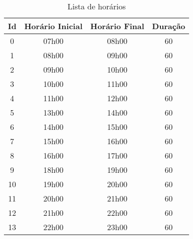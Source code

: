 \begin{apendices}
\begin{table}[H]
\footnotesize
\centering
\begin{tabular}{|c|c|c|c|}
\hline
\textbf{Id} & \textbf{Horário Inicial} & \textbf{Horário Final} & \textbf{Duração} \\ \hline
0 & 07h00 & 08h00 & 60 \\ \hline
1 & 08h00 & 09h00 & 60 \\ \hline
2 & 09h00 & 10h00 & 60 \\ \hline
3 & 10h00 & 11h00 & 60 \\ \hline
4 & 11h00 & 12h00 & 60 \\ \hline
5 & 13h00 & 14h00 & 60 \\ \hline
6 & 14h00 & 15h00 & 60 \\ \hline
7 & 15h00 & 16h00 & 60 \\ \hline
8 & 16h00 & 17h00 & 60 \\ \hline
9 & 18h00 & 19h00 & 60 \\ \hline
10 & 19h00 & 20h00 & 60 \\ \hline
11 & 20h00 & 21h00 & 60 \\ \hline
12 & 21h00 & 22h00 & 60 \\ \hline
13 & 22h00 & 23h00 & 60 \\ \hline
\end{tabular}
\caption{Lista de horários}
\label{ap-lista-horarios-2013}
\end{table}


\end{apendices}
